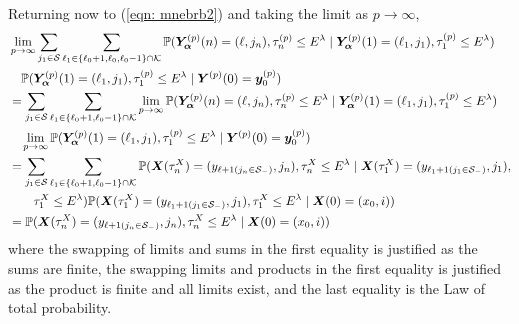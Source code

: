 Returning now to (\ref{eqn: mnebrb2}) and taking the limit as \(p\to \infty \),  
\begin{align}
	&\lim_{p\to\infty}\sum_{j_1\in\mathcal S}\sum_{\ell_1\in\{\ell_0+1,\ell_0,\ell_0-1\}\cap \mathcal K}\mathbb P(\bm{Y}_{\bm{\alpha}}^{(p)}(n) = (\ell, j_n), \tau_{n}^{(p)}\leq E^\lambda 
	 \mid \bm{Y}_{\bm{\alpha}}^{(p)}(1)=(\ell_1,j_1), \tau_{1}^{(p)}\leq E^{\lambda}) \nonumber 
	 \\& \quad\mathbb P(\bm{Y}_{\bm{\alpha}}^{(p)}(1)=(\ell_1, j_1), \tau_{1}^{(p)}\leq E^\lambda
	 \mid \boldsymbol Y^{(p)}(0)=\boldsymbol y_0^{(p)}) \nonumber
	 \\&= \sum_{j_1\in\mathcal S}\sum_{\ell_1\in\{\ell_0+1,\ell_0-1\}\cap \mathcal K} \lim_{p\to\infty} \mathbb P(\bm{Y}_{\bm{\alpha}}^{(p)}(n) = (\ell, j_n), \tau_{n}^{(p)}\leq E^\lambda 
	 \mid \bm{Y}_{\bm{\alpha}}^{(p)}(1)=(\ell_1, j_1), \tau_1^{(p)}\leq E^\lambda) \nonumber
	 \\& \quad\lim_{p\to\infty}\mathbb P(\bm{Y}_{\bm{\alpha}}^{(p)}(1)=(\ell_1, j_1), \tau_{1}^{(p)}\leq E^\lambda
	 \mid \boldsymbol Y^{(p)}(0)=\boldsymbol y_0^{(p)})\nonumber
	 \\&= \sum_{j_1\in\mathcal S}\sum_{\ell_1\in\{\ell_0+1,\ell_0-1\}\cap \mathcal K} \mathbb P(\boldsymbol X(\tau_n^X) = (y_{\ell+1(j_{n}\in\mathcal S_-)}, 
		j_n), \tau_{n}^X\leq E^\lambda \mid \nonumber
		\boldsymbol X(\tau_1^X)=(y_{\ell_{1}+1(j_{1}\in\mathcal S_-)},
		j_{1}),
		\\&\qquad{}\tau_1^X\leq E^\lambda) \nonumber
	 \mathbb P(\boldsymbol X(\tau_1^X)=(y_{\ell_{1}+1(j_{1}\in\mathcal S_-)},
		j_{1}),\tau_1^X\leq E^\lambda
		\mid \boldsymbol X(0)=(x_0, i)) \nonumber
	\\&=\mathbb P(\boldsymbol X(\tau_n^X) = (y_{\ell+1(j_{n}\in\mathcal S_-)}, 
		j_n), \tau_{n}^X\leq E^\lambda
		\mid \boldsymbol X(0)=(x_0, i))
	 \label{eqn: mnebrb22}
\end{align}
where the swapping of limits and sums in the first equality is justified as the sums are finite, the swapping limits and products in the first equality is justified as the product is finite and all limits exist, and the last equality is the Law of total probability. 

